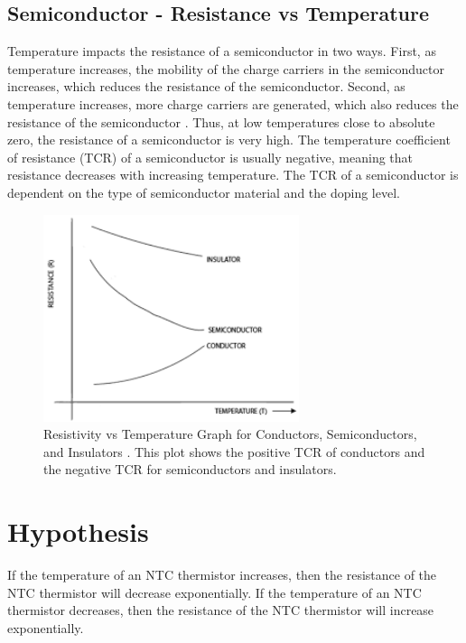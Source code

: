 \subsection{Semiconductor - Resistance vs Temperature}
Temperature impacts the resistance of a semiconductor in two ways. First, as temperature increases, the mobility of the charge carriers in the semiconductor increases, which reduces the resistance of the semiconductor. Second, as temperature increases, more charge carriers are generated, which also reduces the resistance of the semiconductor \citep{butera1997dependence}. Thus, at low temperatures close to absolute zero, the resistance of a semiconductor is very high. The temperature coefficient of resistance (TCR) of a semiconductor is usually negative, meaning that resistance decreases with increasing temperature. The TCR of a semiconductor is dependent on the type of semiconductor material and the doping level.

\begin{figure}[H]
    \centering
    \includegraphics[width=75mm,height=\textheight,keepaspectratio]{images/conductor_semiconductor_insulator.png}
    \caption{Resistivity vs Temperature Graph for Conductors, Semiconductors, and Insulators \citep{mandal_2022}. This plot shows the positive TCR of conductors and the negative TCR for semiconductors and insulators.}
    \label{fig:materials_RT_Plot}
\end{figure}

\section{Hypothesis}
If the temperature of an NTC thermistor increases, then the resistance of the NTC thermistor will decrease exponentially. If the temperature of an NTC thermistor decreases, then the resistance of the NTC thermistor will increase exponentially. 